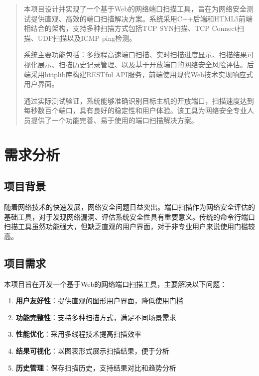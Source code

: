 \documentclass[12pt,hyperref,a4paper,UTF8]{ctexart}
\begin{document}
\cover

\begin{abstract}

本项目设计并实现了一个基于Web的网络端口扫描工具，旨在为网络安全测试提供直观、高效的端口扫描解决方案。系统采用C++后端和HTML5前端相结合的架构，支持多种扫描方式包括TCP SYN扫描、TCP Connect扫描、UDP扫描以及ICMP ping检测。

系统主要功能包括：多线程高速端口扫描、实时扫描进度显示、扫描结果可视化展示、扫描历史记录管理、以及基于开放端口的网络安全风险评估。后端采用httplib库构建RESTful API服务，前端使用现代Web技术实现响应式用户界面。

通过实际测试验证，系统能够准确识别目标主机的开放端口，扫描速度达到每秒数百个端口，具有良好的稳定性和用户体验。该工具为网络安全专业人员提供了一个功能完善、易于使用的端口扫描解决方案。

\end{abstract}

\thispagestyle{empty} %

\newpage
\tableofcontents

\newpage
\section{需求分析}

\subsection{项目背景}
随着网络技术的快速发展，网络安全问题日益突出。端口扫描作为网络安全评估的基础工具，对于发现网络漏洞、评估系统安全性具有重要意义。传统的命令行端口扫描工具虽然功能强大，但缺乏直观的用户界面，对于非专业用户来说使用门槛较高。

\subsection{项目需求}
本项目旨在开发一个基于Web的网络端口扫描工具，主要解决以下问题：

\begin{enumerate}
    \item \textbf{用户友好性}：提供直观的图形用户界面，降低使用门槛
    \item \textbf{功能完整性}：支持多种扫描方式，满足不同场景需求
    \item \textbf{性能优化}：采用多线程技术提高扫描效率
    \item \textbf{结果可视化}：以图表形式展示扫描结果，便于分析
    \item \textbf{历史管理}：保存扫描历史，支持结果对比和趋势分析
\end{enumerate}
\end{document}
